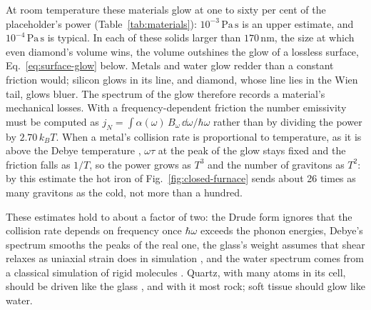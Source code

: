 At room temperature these materials glow at one to sixty per cent of the
placeholder's power (Table~\ref{tab:materials}): $10^{-3}\,\mathrm{Pa\,s}$ is an
upper estimate, and $10^{-4}\,\mathrm{Pa\,s}$ is typical. In each of these
solids larger than $170\,\mathrm{nm}$, the size at which even diamond's volume
wins, the volume outshines the glow of a lossless surface,
Eq.~\eqref{eq:surface-glow} below. Metals and water glow redder than a constant friction would; silicon glows in its line, and
diamond, whose line lies in the Wien tail, glows bluer. The spectrum of the glow
therefore records a material's mechanical losses. With a frequency-dependent
friction the number emissivity must be computed as $j_N = \int \alpha(\omega)\,B_\omega\,\dd\omega/\hbar\omega$ rather
than by dividing the power by $2.70\,k_BT$. When a metal's collision rate is proportional to temperature, as it is above the
Debye temperature \cite{Duthil2014}, $\omega\tau$ at the peak of the glow stays
fixed and the friction falls as $1/T$, so the power grows as $T^3$ and the
number of gravitons as $T^2$: by this estimate the hot iron of
Fig.~\ref{fig:closed-furnace} sends about 26 times as many gravitons as the
cold, not more than a hundred.

These estimates hold to about a factor of two: the Drude form ignores that the
collision rate depends on frequency once $\hbar\omega$ exceeds the phonon
energies, Debye's spectrum smooths the peaks of the real one, the glass's weight
assumes that shear relaxes as uniaxial strain does in simulation
\cite{Leonforte2006}, and the water spectrum comes from a classical simulation of
rigid molecules \cite{Schulz2020}. Quartz, with many atoms in its cell, should be
driven like the glass \cite{Damart2017}, and with it most rock; soft tissue
should glow like water.

